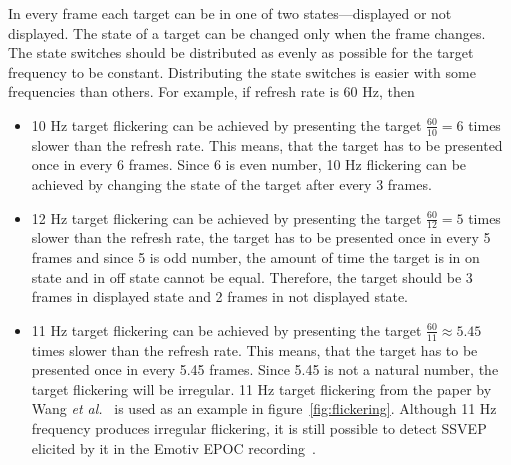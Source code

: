 In every frame each \gls{target} can be in one of two states---displayed or not displayed. The state of a \gls{target} can be changed only when the frame changes. The state switches should be distributed as evenly as possible for the target frequency to be constant. Distributing the state switches is easier with some frequencies than others. For example, if refresh rate is 60 Hz, then
\begin{itemize}
	\item 10 Hz \gls{target} \gls{flickering} can be achieved by presenting the \gls{target} $\frac{60}{10}=6$ times slower than the refresh rate. This means, that the \gls{target} has to be presented once in every 6 frames. Since 6 is even number, 10 Hz \gls{flickering} can be achieved by changing the state of the \gls{target} after every 3 frames.
	\item 12 Hz \gls{target} \gls{flickering} can be achieved by presenting the \gls{target} $\frac{60}{12}=5$ times slower than the refresh rate, the \gls{target} has to be presented once in every 5 frames and since 5 is odd number, the amount of time the target is in on state and in off state cannot be equal. Therefore, the \gls{target} should be 3 frames in displayed state and 2 frames in not displayed state.
	\item 11 Hz \gls{target} \gls{flickering} can be achieved by presenting the \gls{target} $\frac{60}{11}\approx 5.45$ times slower than the refresh rate. This means, that the \gls{target} has to be presented once in every 5.45 frames. Since 5.45 is not a natural number, the \gls{target} \gls{flickering} will be irregular. 11 Hz target flickering from the paper by Wang \textit{et al.}~\cite{11hz} is used as an example in figure~\ref{fig:flickering}. Although 11 Hz frequency produces irregular \gls{flickering}, it is still possible to detect \gls{SSVEP} elicited by it in the Emotiv EPOC recording~\cite{emotiv_11hz}.
\end{itemize}

